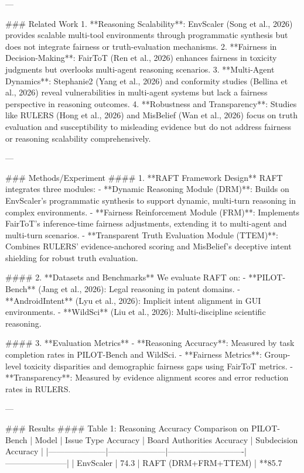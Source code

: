 ---

### Related Work  
1. **Reasoning Scalability**: EnvScaler (Song et al., 2026) provides scalable multi-tool environments through programmatic synthesis but does not integrate fairness or truth-evaluation mechanisms.  
2. **Fairness in Decision-Making**: FairToT (Ren et al., 2026) enhances fairness in toxicity judgments but overlooks multi-agent reasoning scenarios.  
3. **Multi-Agent Dynamics**: Stephanie2 (Yang et al., 2026) and conformity studies (Bellina et al., 2026) reveal vulnerabilities in multi-agent systems but lack a fairness perspective in reasoning outcomes.  
4. **Robustness and Transparency**: Studies like RULERS (Hong et al., 2026) and MisBelief (Wan et al., 2026) focus on truth evaluation and susceptibility to misleading evidence but do not address fairness or reasoning scalability comprehensively.  

---

### Methods/Experiment  
#### 1. **RAFT Framework Design**  
RAFT integrates three modules:  
   - **Dynamic Reasoning Module (DRM)**: Builds on EnvScaler's programmatic synthesis to support dynamic, multi-turn reasoning in complex environments.  
   - **Fairness Reinforcement Module (FRM)**: Implements FairToT's inference-time fairness adjustments, extending it to multi-agent and multi-turn scenarios.  
   - **Transparent Truth Evaluation Module (TTEM)**: Combines RULERS' evidence-anchored scoring and MisBelief's deceptive intent shielding for robust truth evaluation.  

#### 2. **Datasets and Benchmarks**  
We evaluate RAFT on:  
   - **PILOT-Bench** (Jang et al., 2026): Legal reasoning in patent domains.  
   - **AndroidIntent** (Lyu et al., 2026): Implicit intent alignment in GUI environments.  
   - **WildSci** (Liu et al., 2026): Multi-discipline scientific reasoning.  

#### 3. **Evaluation Metrics**  
   - **Reasoning Accuracy**: Measured by task completion rates in PILOT-Bench and WildSci.  
   - **Fairness Metrics**: Group-level toxicity disparities and demographic fairness gaps using FairToT metrics.  
   - **Transparency**: Measured by evidence alignment scores and error reduction rates in RULERS.  

---

### Results  
#### Table 1: Reasoning Accuracy Comparison on PILOT-Bench  
| Model               | Issue Type Accuracy | Board Authorities Accuracy | Subdecision Accuracy |  
|---------------------|---------------------|----------------------------|-----------------------|  
| EnvScaler           | 74.3%
| RAFT (DRM+FRM+TTEM) | **85.7%

